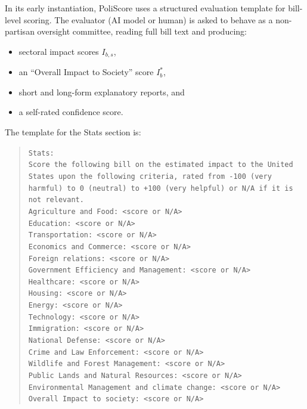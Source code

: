 \documentclass[12pt]{article}
\begin{document}
In its early instantiation, PoliScore uses a structured evaluation template for bill-level scoring. The evaluator (AI model
or human) is asked to behave as a non-partisan oversight committee, reading full bill text and producing:

\begin{itemize}
    \item sectoral impact scores \(I_{b,s}\),
    \item an ``Overall Impact to Society'' score \(I_b^{\ast}\),
    \item short and long-form explanatory reports, and
    \item a self-rated confidence score.
\end{itemize}

The template for the Stats section is:

\begin{quote}
\texttt{Stats:}\\
\texttt{Score the following bill on the estimated impact to the United States upon the following criteria, rated from -100 (very harmful) to 0 (neutral) to +100 (very helpful) or N/A if it is not relevant.}\\

\texttt{Agriculture and Food: <score or N/A>}\\
\texttt{Education: <score or N/A>}\\
\texttt{Transportation: <score or N/A>}\\
\texttt{Economics and Commerce: <score or N/A>}\\
\texttt{Foreign relations: <score or N/A>}\\
\texttt{Government Efficiency and Management: <score or N/A>}\\
\texttt{Healthcare: <score or N/A>}\\
\texttt{Housing: <score or N/A>}\\
\texttt{Energy: <score or N/A>}\\
\texttt{Technology: <score or N/A>}\\
\texttt{Immigration: <score or N/A>}\\
\texttt{National Defense: <score or N/A>}\\
\texttt{Crime and Law Enforcement: <score or N/A>}\\
\texttt{Wildlife and Forest Management: <score or N/A>}\\
\texttt{Public Lands and Natural Resources: <score or N/A>}\\
\texttt{Environmental Management and climate change: <score or N/A>}\\
\texttt{Overall Impact to society: <score or N/A>}
\end{quote}
\end{document}
